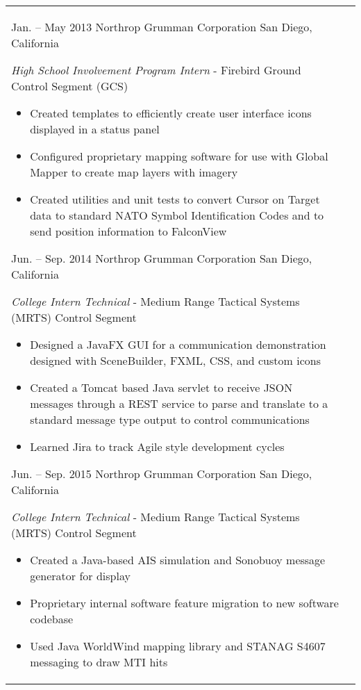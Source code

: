 \documentclass[print]{friggeri-cv} %
\makeatletter
\renewenvironment{entrylist}{%
	\par\begin{tabular*}{\textwidth}{@{\extracolsep{\fill}}ll}
	}{%
\end{tabular*}\par
}
\makeatother
\begin{document}
\begin{entrylist}
\entry
{Jan. -- May 2013}
{Northrop Grumman Corporation}
{San Diego, California}
{\emph{High School Involvement Program Intern} - Firebird Ground Control Segment (GCS)
\begin{itemize}
\item Created templates to efficiently create user interface icons displayed in a status panel
\item Configured proprietary mapping software for use with Global Mapper to create map layers with imagery
\item Created utilities and unit tests to convert Cursor on Target data to standard NATO Symbol Identification Codes and to send position information to FalconView
\end{itemize}}
\entry
{Jun. -- Sep. 2014}
{Northrop Grumman Corporation}
{San Diego, California}
{\emph{College Intern Technical} - Medium Range Tactical Systems (MRTS) Control Segment
\begin{itemize}
\item Designed a JavaFX GUI for a communication demonstration designed with SceneBuilder, FXML, CSS, and custom icons
\item Created a Tomcat based Java servlet to receive JSON messages through a REST service to parse and translate to a standard message type output to control communications
\item Learned Jira to track Agile style development cycles
\end{itemize}}
\entry
{Jun. -- Sep. 2015}
{Northrop Grumman Corporation}
{San Diego, California}
{\emph{College Intern Technical} - Medium Range Tactical Systems (MRTS) Control Segment
\begin{itemize}
\item Created a Java-based AIS simulation and Sonobuoy message generator for display
\item Proprietary internal software feature migration to new software codebase
\item Used Java WorldWind mapping library and STANAG S4607 messaging to draw MTI hits
\end{itemize}}
\end{entrylist}

\end{document}
